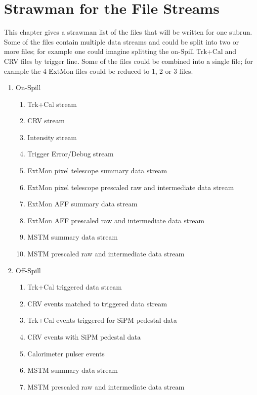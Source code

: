 \chapter{Strawman for the File Streams}
\label{ch:file_streams}

This chapter gives a strawman list of the files that will be written for one subrun.
Some of the files contain multiple data streams and could be split into two or more files;
for example one could imagine splitting the on-Spill Trk+Cal and CRV files by trigger line.
Some of the files could be combined into a single file; for example the 4 ExtMon files could
be reduced to 1, 2 or 3 files.


\begin{enumerate}
\item On-Spill
  \begin{enumerate}
    \item Trk+Cal stream
    \item CRV stream
    \item Intensity stream
    \item Trigger Error/Debug stream
    \item ExtMon pixel telescope summary data stream
    \item ExtMon pixel telescope prescaled raw and intermediate data stream
    \item ExtMon AFF  summary data stream
    \item ExtMon AFF prescaled raw and intermediate data stream
    \item MSTM summary data stream
    \item MSTM prescaled raw and intermediate data stream
  \end{enumerate}
%
\item Off-Spill
  \begin{enumerate}
    \item Trk+Cal triggered data stream
    \item CRV events matched to triggered data stream
    \item Trk+Cal events triggered for SiPM pedestal data
    \item CRV events with SiPM pedestal data
    \item Calorimeter pulser events
    \item MSTM summary data stream
    \item MSTM prescaled raw and intermediate data stream
  \end{enumerate}
\end{enumerate}


